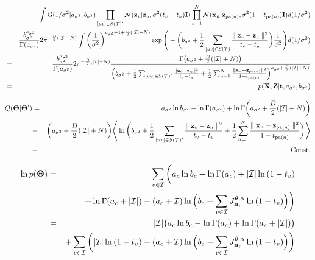 \documentclass{article}
\begin{document}
	\begin{eqnarray}
		& & \int \textrm{G}(1/\sigma^2 | a_{\sigma^2}, b_{\sigma^2}) \prod_{[uv] \in S(\mathcal{T})'} \mathcal{N}(\bold{z}_v|\bold{z}_u, \sigma^2(t_v - t_u)\bold{I}) \prod^N_{n=1} \mathcal{N}(\bold{x}_n|\bold{z}_{\textrm{pa}(n)}, \sigma^2(1 - t_{\textrm{pa}(n)})\bold{I}) d(1/\sigma^2) \nonumber \\
		&=& \frac{b^{a_{\sigma^2}}_{\sigma^2}}{\Gamma(a_{\sigma^2})}  2\pi^{-\frac{D}{2}(|\mathcal{I}| + N)} \int \bigg( \frac{1}{\sigma^2} \bigg)^{a_{\sigma^2} - 1 + \frac{D}{2}(|\mathcal{I}| + N)} \exp{\Bigg( - \bigg( b_{\sigma^2} + \frac{1}{2}\sum_{[uv] \in S(\mathcal{T})} \frac{\parallel \bold{z}_v - \bold{z}_u \parallel^2}{t_v - t_u} \bigg) \frac{1}{\sigma^2} \Bigg)} \nonumber d(1/\sigma^2) \\
		&=& \frac{b^{a_{\sigma^2}}_{\sigma^2}}{\Gamma(a_{\sigma^2})}  2\pi^{-\frac{D}{2}(|\mathcal{I}| + N)} \frac{\Gamma \big( a_{\sigma^2} + \frac{D}{2}(|\mathcal{I}| + N) \big)}{\Big( b_{\sigma^2} + \frac{1}{2}\sum_{[uv] \in S(\mathcal{T})'} \frac{\parallel \bold{z}_v - \bold{z}_u \parallel^2}{t_v - t_u} + \frac{1}{2}\sum^N_{n=1} \frac{\parallel \bold{x}_n - \bold{z}_{\textrm{pa}(n)} \parallel^2}{1 - t_{\textrm{pa}(n)}} \Big)^{a_{\sigma^2} + \frac{D}{2}(|\mathcal{I}| + N)}} \nonumber \\
		&=& p(\bold{X}, \bold{Z} | \bold{t}, a_{\sigma^2}, b_{\sigma^2})
	\end{eqnarray}

	\begin{eqnarray}
		Q(\boldsymbol{\Theta} | \boldsymbol{\Theta}')
		&=&	a_{\sigma^2}\ln{b_{\sigma^2}} - \ln{\Gamma(a_{\sigma^2})}
		+ \ln{\Gamma \bigg(a_{\sigma^2} + \frac{D}{2}(|\mathcal{I}| + N) \bigg)}
		\nonumber \\
		&-& \bigg( a_{\sigma^2} + \frac{D}{2}(|\mathcal{I}| + N) \bigg)
		\Bigg< \ln{\bigg( b_{\sigma^2} + \frac{1}{2}\sum_{[uv] \in S(\mathcal{T})'} \frac{\parallel \bold{z}_v - \bold{z}_u \parallel^2}{t_v - t_u} + \frac{1}{2}\sum^N_{n=1} \frac{\parallel \bold{x}_n - \bold{z}_{\textrm{pa}(n)} \parallel^2}{1 - t_{\textrm{pa}(n)}} \bigg)} \Bigg>
		\nonumber \\
		&+& \textrm{Const.}
	\end{eqnarray}

	\begin{eqnarray}
		\ln{p(\boldsymbol{\Theta})} 
		&=& \sum_{v \in \mathcal{I}}	 \bigg(
		a_c\ln{b_c} - \ln{\Gamma(a_c)} + |\mathcal{I}|\ln{(1 - t_v)} 
		\nonumber \\
		& & + \ln{\Gamma(a_c + |\mathcal{I}|)}
		- (a_c + \mathcal{I})\ln{\Big( b_c - \sum_{v \in \mathcal{I}}J^{\theta, \alpha}_{\bold{n}_v} \ln{(1 - t_v)} \Big)} \bigg)
		\nonumber \\
		&=& |\mathcal{I}|\big( a_c\ln{b_c} - \ln{\Gamma(a_c)} + \ln{\Gamma(a_c + |\mathcal{I}|)} \big)
		\nonumber \\
		& & + \sum_{v \in \mathcal{I}} \bigg( |\mathcal{I}|\ln{(1 - t_v)} - (a_c + \mathcal{I})\ln{\Big( b_c - \sum_{v \in \mathcal{I}}J^{\theta, \alpha}_{\bold{n}_v} \ln{(1 - t_v)} \Big)} \bigg)
		\nonumber \\
	\end{eqnarray}
\end{document}
